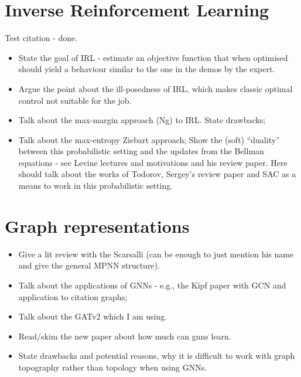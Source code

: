 \documentclass{report}
\numberwithin{equation}{section}
\numberwithin{figure}{section}
\numberwithin{table}{section}
\numberwithin{algorithm}{section}
\begin{document}
\chapter{Inverse Reinforcement Learning}
Test citation \citep{NgIRL} - done.
\begin{itemize}
  \item State the goal of IRL - estimate an objective function
    that when optimised should yield a behaviour similar to the 
    one in the demos by the expert.
  \item Argue the point about the ill-posedness of IRL, which makes 
    classic optimal control not suitable for the job.
  \item Talk about the max-margin approach (Ng) to IRL.
    State drawbacks;
  \item Talk about the max-entropy Ziebart approach;
    Show the (soft) ``duality'' between this probabilistic setting and 
    the updates from the Bellman equations - see Levine lectures 
    and motivations and his review paper. Here should talk about the 
    works of Todorov, Sergey's review paper and SAC as a means to 
    work in this probabilistic setting.
\end{itemize}

\chapter{Graph representations}
\begin{itemize}
  \item Give a lit review with the Scarsalli (can be enough to just 
  mention his name and give the general MPNN structure).
  \item Talk about the applications of GNNs - e.g., the Kipf paper 
    with GCN and application to citation graphs;
  \item Talk about the GATv2 which I am using.
  \item Read/skim the new paper about how much can gnns learn.
  \item State drawbacks and potential reasons, why it is difficult 
    to work with graph topography rather than topology when using 
    GNNs.
\end{itemize}

\end{document}
